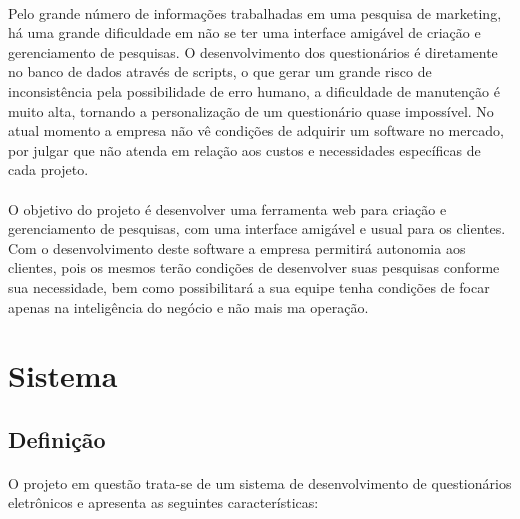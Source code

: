 \documentclass[11pt]{article}
\begin{document}
    \paragraph{} \hspace{10pt}

    Pelo grande número de informações trabalhadas em uma pesquisa de marketing, há uma grande dificuldade em não se ter uma interface amigável de criação e gerenciamento de pesquisas.
    O desenvolvimento dos questionários é diretamente no banco de dados através de scripts, o que gerar um grande risco de inconsistência pela possibilidade de erro humano, a dificuldade de manutenção é muito alta, tornando a personalização de um questionário quase impossível.
    No atual momento a empresa não vê condições de adquirir um software no mercado, por julgar que não atenda em relação aos custos e necessidades específicas de cada projeto.

    \paragraph{} \hspace{10pt}

    O objetivo do projeto é desenvolver uma ferramenta web para criação e gerenciamento de pesquisas, com uma interface amigável e usual para os clientes. Com o desenvolvimento deste software a empresa permitirá autonomia aos clientes, pois os mesmos terão condições de desenvolver suas pesquisas conforme sua necessidade, bem como possibilitará a sua equipe tenha condições de focar apenas na inteligência do negócio e não mais ma operação.

  \newpage

  \section{Sistema}

    \subsection{Definição}

      \paragraph{} \hspace{10pt}
      
      O projeto em questão trata-se de um sistema de desenvolvimento de questionários eletrônicos e apresenta as seguintes características:
\end{document}
